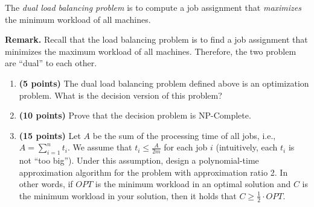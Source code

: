 \documentclass[paper=a4, fontsize=11pt]{scrartcl} %
\numberwithin{figure}{section} %
\numberwithin{table}{section} %
\begin{document}
\begin{enumerate}
The \textit{dual load balancing problem} is to compute a job assignment that \textit{maximizes} the minimum
workload of all machines.

\textbf{Remark.} Recall that the load balancing problem is to find a job assignment that minimizes
the maximum workload of all machines. Therefore, the two problem are \enquote{dual} to each other.
\begin{enumerate}
\item \textbf{(5 points)} The dual load balancing problem defined above is an optimization problem.
What is the decision version of this problem?
\item \textbf{(10 points)} Prove that the decision problem is NP-Complete.
\item \textbf{(15 points)} Let $A$ be the sum of the processing time of all jobs, i.e., $A = \sum\limits_{i=1}^n t_i$. We assume that $t_i \leq \frac{A}{2m}$ for each job $i$ (intuitively, each $t_i$ is not \enquote{too big}). Under this assumption, design a polynomial-time approximation algorithm for the problem with
approximation ratio 2. In other words, if $OPT$ is the minimum workload in an optimal
solution and $C$ is the minimum workload in your solution, then it holds that $C \geq \frac{1}{2} \cdot OPT$.
\end{enumerate}
\end{enumerate}

\end{document}
